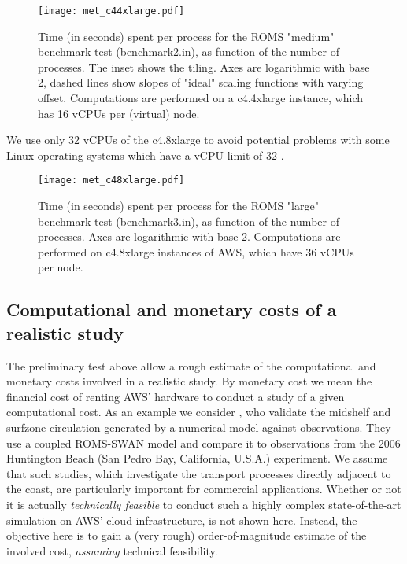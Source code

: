 \documentclass[12pt,a4paper]{article}
\begin{document}
\begin{figure}[H]
	\centering
	\texttt{[image: met\_c44xlarge.pdf]}
	\caption{Time (in seconds) spent per process for the ROMS "medium" benchmark test (benchmark2.in), as function of the number of processes. The inset shows the tiling. Axes are logarithmic with base 2, dashed lines show slopes of "ideal" scaling functions with varying offset. Computations are performed on a c4.4xlarge instance, which has 16 vCPUs per (virtual) node.}
	\label{fig:met_c44xlarge}
\end{figure}

We use only 32 vCPUs of the c4.8xlarge to avoid potential problems with some Linux operating systems which have a vCPU limit of 32 \citep{web:ec2_c4}.

\begin{figure}[H]
	\centering
	\texttt{[image: met\_c48xlarge.pdf]}
	\caption{Time (in seconds) spent per process for the ROMS "large" benchmark test (benchmark3.in), as function of the number of processes.  Axes are logarithmic with base 2. Computations are performed on c4.8xlarge instances of AWS, which have 36 vCPUs per node.}
	\label{fig:met_c48xlarge}
\end{figure}

\subsection{Computational and monetary costs of a realistic study}

The preliminary test above allow a rough estimate of the computational and monetary costs involved in a realistic study. By monetary cost we mean the financial cost of renting AWS' hardware to conduct a study of a given computational cost. As an example we consider \cite{kumar2015midshelf}, who validate the midshelf and surfzone circulation generated by a numerical model against observations.  They use a coupled ROMS-SWAN model and compare it to observations from the 2006 Huntington Beach (San Pedro Bay, California, U.S.A.) experiment. We assume that such studies, which investigate the transport processes directly adjacent to the coast, are particularly important for commercial applications. Whether or not it is actually \emph{technically feasible} to conduct such a highly complex state-of-the-art simulation on AWS' cloud infrastructure, is not shown here. Instead, the objective here is to gain a (very rough) order-of-magnitude estimate of the involved cost, \emph{assuming} technical feasibility. 
\end{document}
